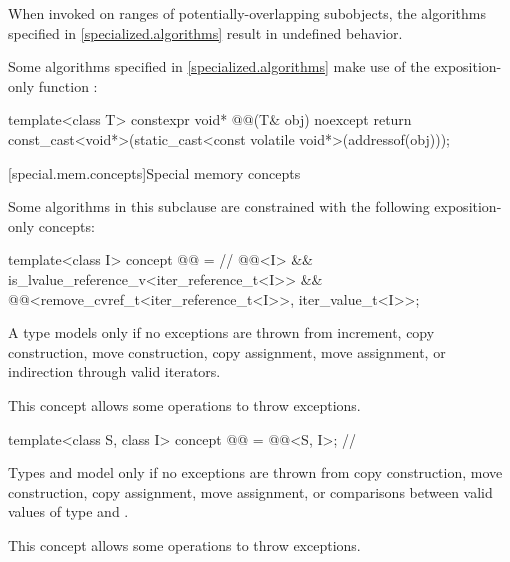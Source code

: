 \pnum
\begin{note}
When invoked on ranges of
potentially-overlapping subobjects,
the algorithms specified in \ref{specialized.algorithms}
result in undefined behavior.
\end{note}

\pnum
Some algorithms specified in \ref{specialized.algorithms} make use of the exposition-only function
:
\begin{codeblock}
template<class T>
  constexpr void* @@(T& obj) noexcept {
    return const_cast<void*>(static_cast<const volatile void*>(addressof(obj)));
  }
\end{codeblock}

[special.mem.concepts]{Special memory concepts}

\pnum
Some algorithms in this subclause are constrained with the following
exposition-only concepts:
\begin{itemdecl}
template<class I>
concept @@ = // \expos
  @@<I> &&
  is_lvalue_reference_v<iter_reference_t<I>> &&
  @@<remove_cvref_t<iter_reference_t<I>>, iter_value_t<I>>;
\end{itemdecl}

\begin{itemdescr}
\pnum
A type  models  only if
no exceptions are thrown from increment,
copy construction, move construction,
copy assignment, move assignment,
or indirection through valid iterators.

\pnum
\begin{note}
This concept allows some 
operations to throw exceptions.
\end{note}
\end{itemdescr}

\begin{itemdecl}
template<class S, class I>
concept @@ = @@<S, I>; // \expos
\end{itemdecl}

\begin{itemdescr}
\pnum
Types  and  model 
only if no exceptions are thrown from copy construction, move construction,
copy assignment, move assignment, or comparisons between
valid values of type  and .

\pnum
\begin{note}
This concept allows some 
operations to throw exceptions.
\end{note}
\end{itemdescr}

